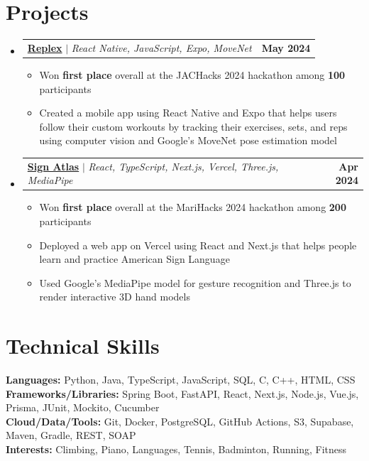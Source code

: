 \documentclass[letterpaper,11pt]{article}
\makeatletter
\newcommand{\resumeItem}[1]{
  \item\small{
    {#1 \vspace{-2pt}}
  }
}
\newcommand{\resumeProjectHeading}[4]{
  \item
  \begin{tabular*}{\textwidth}{l@{\extracolsep{\fill}}r}
    \small{\href{#3}{\textbf{#1}\hspace{0.3em}{\faLink}} $|$ \emph{#2}} & \textbf{\small #4} \\
  \end{tabular*}\vspace{-7pt}
}
\newcommand{\resumeSubHeadingListStart}{\begin{itemize}[leftmargin=0in, label={}]}
\newcommand{\resumeSubHeadingListEnd}{\end{itemize}}
\newcommand{\resumeItemListStart}{\begin{itemize}}
\newcommand{\resumeItemListEnd}{\end{itemize}\vspace{-5pt}}
\makeatother
\begin{document}
\section{Projects}
    \resumeSubHeadingListStart
      \resumeProjectHeading
          {Replex}
          {React Native, JavaScript, Expo, MoveNet}
          {https://devpost.com/software/replex}
          {May 2024}
          \resumeItemListStart
            \resumeItem{Won \textbf{first place} overall at the JACHacks 2024 hackathon among \textbf{100} participants}
            \resumeItem{Created a mobile app using React Native and Expo that helps users follow their custom workouts by tracking their exercises, sets, and reps using computer vision and Google's MoveNet pose estimation model}
          \resumeItemListEnd
      \resumeProjectHeading
          {Sign Atlas}
          {React, TypeScript, Next.js, Vercel, Three.js, MediaPipe}
          {https://devpost.com/software/sign-atlas}
          {Apr 2024}
          \resumeItemListStart
            \resumeItem{Won \textbf{first place} overall at the MariHacks 2024 hackathon among \textbf{200} participants}
            \resumeItem{Deployed a web app on Vercel using React and Next.js that helps people learn and practice American Sign Language}
            \resumeItem{Used Google's MediaPipe model for gesture recognition and Three.js to render interactive 3D hand models}
          \resumeItemListEnd
    \resumeSubHeadingListEnd

\section{Technical Skills}
 \begin{itemize}[leftmargin=0in, label={}]
    \small{\item{
     \textbf{Languages:}{ Python, Java, TypeScript, JavaScript, SQL, C, C++, HTML, CSS} \\
     \textbf{Frameworks/Libraries:}{ Spring Boot, FastAPI, React, Next.js, Node.js, Vue.js, Prisma, JUnit, Mockito, Cucumber} \\
     \textbf{Cloud/Data/Tools:}{ Git, Docker, PostgreSQL, GitHub Actions, S3, Supabase, Maven, Gradle, REST, SOAP} \\
     \textbf{Interests:}{ Climbing, Piano, Languages, Tennis, Badminton, Running, Fitness } \\
    }}
 \end{itemize}

\end{document}
